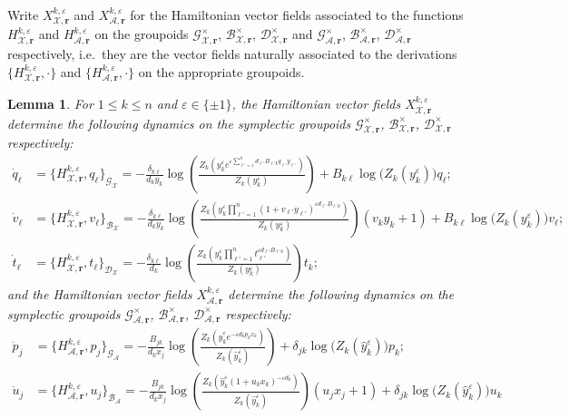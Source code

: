 \documentclass{amsart}
\newtheorem{lemma}[theorem]{Lemma}
\numberwithin{equation}{section}
\newcommand{\bfr}{{\boldsymbol{r}}}
\newcommand{\cA}{\mathcal{A}}
\newcommand{\cB}{\mathcal{B}}
\newcommand{\cD}{\mathcal{D}}
\newcommand{\cG}{\mathcal{G}}
\newcommand{\cX}{\mathcal{X}}
\begin{document}
Write $X_{\cX,\bfr}^{k,\varepsilon}$ and $X_{\cA,\bfr}^{k,\varepsilon}$ for the Hamiltonian vector fields associated to the functions $H_{\cX,\bfr}^{k,\varepsilon}$ and $H_{\cA,\bfr}^{k,\varepsilon}$ on the groupoids $\cG^\times_{\cX,\bfr}$, $\cB^\times_{\cX,\bfr}$, $\cD^\times_{\cX,\bfr}$ and $\cG^\times_{\cA,\bfr}$, $\cB^\times_{\cA,\bfr}$, $\cD^\times_{\cA,\bfr}$ respectively, i.e.\ they are the vector fields naturally associated to the derivations $\{H_{\cX,\bfr}^{k,\varepsilon},\cdot\}$ and $\{H_{\cA,\bfr}^{k,\varepsilon},\cdot\}$ on the appropriate groupoids.
\begin{lemma}
  For $1\le k\le n$ and $\varepsilon\in\{\pm1\}$, the Hamiltonian vector fields $X_{\cX,\bfr}^{k,\varepsilon}$ determine the following dynamics on the symplectic groupoids $\cG^\times_{\cX,\bfr}$, $\cB^\times_{\cX,\bfr}$, $\cD^\times_{\cX,\bfr}$ respectively:
  \begin{align}
    \dot q_\ell&=\{H_{\cX,\bfr}^{k,\varepsilon},q_\ell\}_{\cG_\cX}=-\frac{\delta_{k\ell}}{d_ky_k}\log\left(\frac{Z_k\left(y_k^\varepsilon e^{\varepsilon\sum_{\ell'=1}^n d_{\ell'} B_{\ell' k}q_{\ell'} y_{\ell'}}\right)}{Z_k(y_k^\varepsilon)}\right)+B_{k\ell}\log\big(Z_k(y_k^\varepsilon)\big)q_\ell;\\
    \dot v_\ell&=\{H_{\cX,\bfr}^{k,\varepsilon},v_\ell\}_{\cB_\cX}=-\frac{\delta_{k\ell}}{d_ky_k}\log\left(\frac{Z_k\left(y_k^\varepsilon \prod_{\ell'=1}^n (1+v_{\ell'}y_{\ell'})^{\varepsilon d_{\ell'} B_{\ell' k}}\right)}{Z_k(y_k^\varepsilon)}\right)(v_ky_k+1)+B_{k\ell}\log\big(Z_k(y_k^\varepsilon)\big)v_\ell;\\
    \dot t_\ell&=\{H_{\cX,\bfr}^{k,\varepsilon},t_\ell\}_{\cD_\cX}=-\frac{\delta_{k\ell}}{d_k}\log\left(\frac{Z_k\left(y_k^\varepsilon \prod_{\ell'=1}^nt_{\ell'}^{\varepsilon d_{\ell'} B_{\ell' k}}\right)}{Z_k(y_k^\varepsilon)}\right)t_k;
  \end{align}
  and the Hamiltonian vector fields $X_{\cA,\bfr}^{k,\varepsilon}$ determine the following dynamics on the symplectic groupoids $\cG^\times_{\cA,\bfr}$, $\cB^\times_{\cA,\bfr}$, $\cD^\times_{\cA,\bfr}$ respectively:
  \begin{align}
    \label{eq:p dot}
    \dot p_j&=\{H_{\cA,\bfr}^{k,\varepsilon},p_j\}_{\cG_\cA}=-\frac{B_{jk}}{d_kx_j}\log\left(\frac{Z_k\left(\hat y_k^\varepsilon e^{-\varepsilon d_kp_kx_k}\right)}{Z_k(\hat y_k^\varepsilon)}\right)+\delta_{jk}\log\big(Z_k(\hat y_k^\varepsilon)\big)p_k;\\
    \label{eq:u dot}
    \dot u_j&=\{H_{\cA,\bfr}^{k,\varepsilon},u_j\}_{\cB_\cA}=-\frac{B_{jk}}{d_kx_j}\log\left(\frac{Z_k\left(\hat y_k^\varepsilon (1+u_kx_k)^{-\varepsilon d_k}\right)}{Z_k(\hat y_k^\varepsilon)}\right)(u_jx_j+1)+\delta_{jk}\log\big(Z_k(\hat y_k^\varepsilon)\big)u_k\\

\end{align}
\end{lemma}
\end{document}
